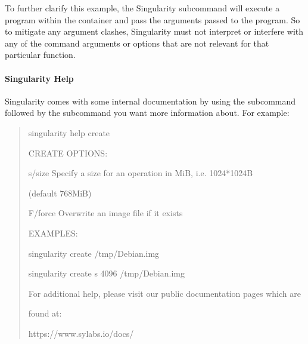 \documentclass[letterpaper,10pt,english]{sphinxmanual}
\begin{document}
To further clarify this example, the  Singularity subcommand will
execute a program within the container and pass the arguments passed
to the program. So to mitigate any argument clashes, Singularity must
not interpret or interfere with any of the command arguments or
options that are not relevant for that particular function.


\paragraph{Singularity Help}
\label{\detokenize{appendix:singularity-help}}
Singularity comes with some internal documentation by using the 
subcommand followed by the subcommand you want more information about.
For example:
\begin{quote}

%
\begin{sphinxVerbatim}[commandchars=\\\{\}]
\PYGZdl{} singularity help create

CREATE OPTIONS:

    \PYGZhy{}s/\PYGZhy{}\PYGZhy{}size   Specify a size for an operation in MiB, i.e. 1024*1024B

                (default 768MiB)

    \PYGZhy{}F/\PYGZhy{}\PYGZhy{}force  Overwrite an image file if it exists


EXAMPLES:


    \PYGZdl{} singularity create /tmp/Debian.img

    \PYGZdl{} singularity create \PYGZhy{}s 4096 /tmp/Debian.img


For additional help, please visit our public documentation pages which are

found at:


    https://www.sylabs.io/docs/
\end{sphinxVerbatim}
\end{quote}
\end{document}

